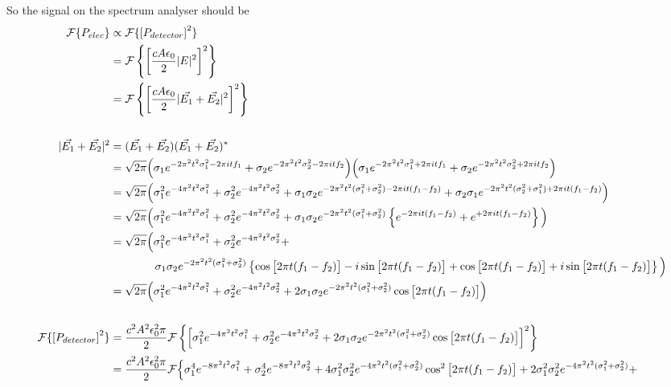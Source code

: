 So the signal on the spectrum analyser should be
\begin{align}
\mathcal{F}\{P_{elec}\} &\propto \mathcal{F}\{\left[P_{detector}\right]^2\}\notag\\
&= \mathcal{F}\left\{\left[\frac{cA\epsilon_0}{2}|E|^2\right]^2\right\}\notag\\
&= \mathcal{F}\left\{\left[\frac{cA\epsilon_0}{2}|\vec{E_1}+\vec{E_2}|^2\right]^2\right\}\\\notag\\
|\vec{E_1}+\vec{E_2}|^2 &= (\vec{E_1}+\vec{E_2})(\vec{E_1}+\vec{E_2})^*\notag\\
&= \sqrt{2\pi} \Big(\sigma_1 e^{-2\pi^2t^2\sigma_1^2-2\pi i t f_1} + \sigma_2 e^{-2\pi^2t^2\sigma_2^2-2\pi i t f_2}\Big)\Big(\sigma_1 e^{-2\pi^2t^2\sigma_1^2+2\pi i t f_1} + \sigma_2 e^{-2\pi^2t^2\sigma_2^2+2\pi i t f_2}\Big)\notag\\
&= \sqrt{2\pi}\Big(\sigma_1^2 e^{-4\pi^2t^2\sigma_1^2} + \sigma_2^2 e^{-4\pi^2t^2\sigma_2^2} + \sigma_1\sigma_2 e^{-2\pi^2t^2(\sigma_1^2+\sigma_2^2)-2\pi i t (f_1-f_2)} + \sigma_2\sigma_1 e^{-2\pi^2t^2(\sigma_2^2+\sigma_1^2)+2\pi i t (f_1-f_2)} \Big)\notag\\
&= \sqrt{2\pi}\Big(\sigma_1^2 e^{-4\pi^2t^2\sigma_1^2} + \sigma_2^2 e^{-4\pi^2t^2\sigma_2^2} + \sigma_1\sigma_2 e^{-2\pi^2t^2(\sigma_1^2+\sigma_2^2)}\left\{e^{-2\pi i t (f_1-f_2)} + e^{+2\pi i t (f_1-f_2)} \right\}\Big)\notag\\
&= \sqrt{2\pi}\Big(\sigma_1^2 e^{-4\pi^2t^2\sigma_1^2} + \sigma_2^2 e^{-4\pi^2t^2\sigma_2^2} + \notag\\&\quad\quad\quad\quad\sigma_1\sigma_2 e^{-2\pi^2t^2(\sigma_1^2+\sigma_2^2)}\left\{\cos\big[2\pi t (f_1-f_2)\big]-i\sin\big[2\pi t (f_1-f_2)\big] + \cos\big[2\pi t (f_1-f_2)\big]+i\sin\big[2\pi t (f_1-f_2)\big]\right\} \Big)\notag\\
&= \sqrt{2\pi}\Big(\sigma_1^2 e^{-4\pi^2t^2\sigma_1^2} + \sigma_2^2 e^{-4\pi^2t^2\sigma_2^2} + 2\sigma_1\sigma_2 e^{-2\pi^2t^2(\sigma_1^2+\sigma_2^2)}\cos\big[2\pi t (f_1-f_2)\big] \Big)\\
\notag\\
\mathcal{F}\{\left[P_{detector}\right]^2\} &= \frac{c^2A^2\epsilon_0^2 \pi}{2}\mathcal{F}\left\{\left[\sigma_1^2 e^{-4\pi^2t^2\sigma_1^2} + \sigma_2^2 e^{-4\pi^2t^2\sigma_2^2} + 2\sigma_1\sigma_2 e^{-2\pi^2t^2(\sigma_1^2+\sigma_2^2)}\cos\big[2\pi t (f_1-f_2)\big] \right]^2\right\}\notag\\
&= \frac{c^2A^2\epsilon_0^2 \pi}{2}\mathcal{F}\Big\{\sigma_1^4 e^{-8\pi^2t^2\sigma_1^2} + \sigma_2^4 e^{-8\pi^2t^2\sigma_2^2} + 4\sigma_1^2\sigma_2^2 e^{-4\pi^2t^2(\sigma_1^2+\sigma_2^2)}\cos^2\big[2\pi t (f_1-f_2)\big] + 2\sigma_1^2\sigma_2^2 e^{-4\pi^2t^2(\sigma_1^2+\sigma_2^2)} +\notag\\

\end{align}
